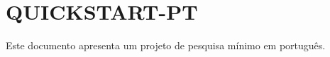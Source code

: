 \documentclass{abntexto-ufc}
\begin{document}
\section{QUICKSTART-PT}
Este documento apresenta um projeto de pesquisa mínimo em português.
\end{document}
